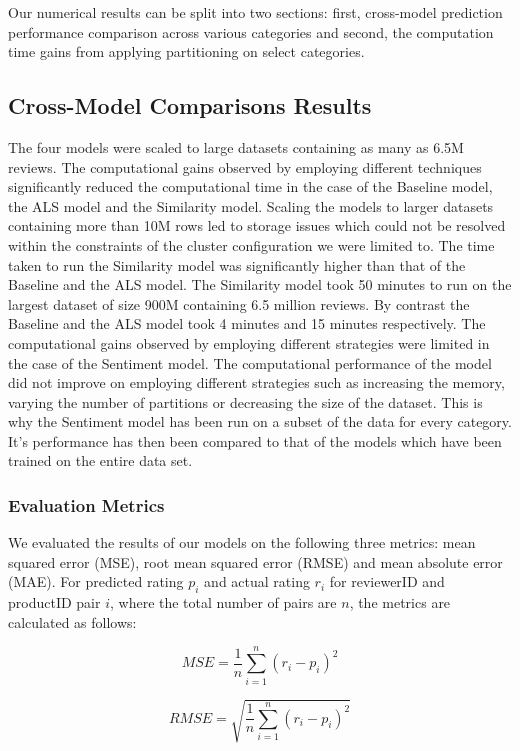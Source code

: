 \documentclass[sigconf,authorversion,nonacm]{acmart}
\begin{document}
Our numerical results can be split into two sections: first, cross-model prediction performance comparison across various categories and second, the computation time gains from applying partitioning on select categories. 

\subsection{Cross-Model Comparisons Results}

The four models were scaled to large datasets containing as many as 6.5M reviews. The computational gains observed by employing different techniques significantly reduced the computational time in the case of the Baseline model, the ALS model and the Similarity model. Scaling the models to larger datasets containing more than 10M rows led to storage issues which could not be resolved within the constraints of the cluster configuration we were limited to. The time taken to run the Similarity model was significantly higher than that of the Baseline and the ALS model. The Similarity model took 50 minutes to run on the largest dataset of size 900M containing 6.5 million reviews. By contrast the Baseline and the ALS model took 4 minutes and 15 minutes respectively. The computational gains observed by employing different strategies were limited in the case of the Sentiment model. The computational performance of the model did not improve on employing different strategies such as increasing the memory, varying the number of partitions or decreasing the size of the dataset. This is why the Sentiment model has been run on a subset of the data for every category. It's performance has then been compared to that of the models which have been trained on the entire data set.

\subsubsection{Evaluation Metrics}
We evaluated the results of our models on the following three metrics: mean squared error (MSE), root mean squared error (RMSE) and mean absolute error (MAE). For predicted rating $p_i$ and actual rating $r_i$ for reviewerID and productID pair $i$, where the total number of pairs are $n$, the metrics are calculated as follows: \cite{james2013introduction}

$$ MSE = \frac{1}{n} \sum^{n}_{i=1} (r_i - p_i)^2 $$

$$ RMSE = \sqrt{\frac{1}{n} \sum^{n}_{i=1} (r_i - p_i)^2 }$$
\end{document}

